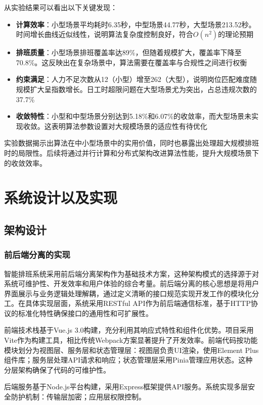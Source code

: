 \documentclass{ctexart}
\begin{document}
从实验结果可以看出以下关键发现：

\begin{itemize}
\item \textbf{计算效率}：小型场景平均耗时6.35秒，中型场景44.77秒，大型场景213.52秒。时间增长曲线近似线性，说明算法复杂度控制良好，符合$O(n^2)$的理论预期

\item \textbf{排班质量}：小型场景排班覆盖率达89\%，但随着规模扩大，覆盖率下降至70.8\%。这反映出在复杂场景中，算法需要在覆盖率与合规性之间进行权衡

\item \textbf{约束满足}：人力不足次数从12（小型）增至262（大型），说明岗位匹配难度随规模扩大呈指数增长。日工时超限问题在大型场景尤为突出，占总违规次数的37.7\%

\item \textbf{收敛特性}：小型和中型场景分别达到5.18\%和6.07\%的收敛率，而大型场景未实现收敛。这表明算法参数设置对大规模场景的适应性有待优化
\end{itemize}

实验数据揭示出算法在中小型场景中的实用价值，同时也暴露出处理超大规模排班时的局限性。后续将通过并行计算和分布式架构改进算法性能，提升大规模场景下的收敛效率。


\section{系统设计以及实现}
\subsection{架构设计}
\subsubsection{前后端分离的实现}
智能排班系统采用前后端分离架构作为基础技术方案，这种架构模式的选择源于对系统可维护性、开发效率和用户体验的综合考量。前后端分离的核心思想是将用户界面展示与业务逻辑处理解耦，通过定义清晰的接口规范实现开发工作的模块化分工。在具体实现层面，系统采用RESTful API作为前后端通信标准，基于HTTP协议的标准化特性确保接口的通用性和可扩展性。

前端技术栈基于Vue.js 3.0构建，充分利用其响应式特性和组件化优势。项目采用Vite作为构建工具，相比传统Webpack方案显著提升了开发效率。前端代码按功能模块划分为视图层、服务层和状态管理层：视图层负责UI渲染，使用Element Plus组件库；服务层处理API请求和响应；状态管理层采用Pinia管理应用状态。这种分层架构确保了代码的可维护性。

后端服务基于Node.js平台构建，采用Express框架提供API服务。系统实现多层安全防护机制：传输层加密；应用层权限控制。
\end{document}

